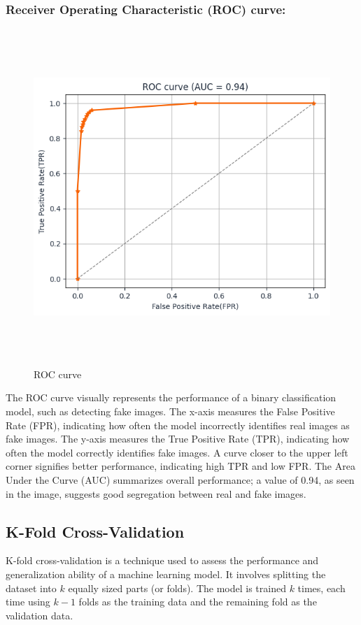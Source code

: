 \subsubsection{Receiver Operating Characteristic (ROC) curve:}
\begin{figure}[ht]
    \centering
    \includegraphics[width=5in, height =5in ]{img/ROC_AUC.png}
    \caption{{ROC curve }}
\end{figure}

\noindent The ROC curve visually represents the performance of a binary classification model, such as detecting fake images. The x-axis measures the False Positive Rate (FPR), indicating how often the model incorrectly identifies real images as fake images. The y-axis measures the True Positive Rate (TPR), indicating how often the model correctly identifies fake images. A curve closer to the upper left corner signifies better performance, indicating high TPR and low FPR. The Area Under the Curve (AUC) summarizes overall performance; a value of 0.94, as seen in the image, suggests good segregation  between real and fake images.
\newpage
\subsection{K-Fold Cross-Validation}

K-fold cross-validation is a technique used to assess the performance and generalization ability of a machine learning model. It involves splitting the dataset into \(k\) equally sized parts (or folds). The model is trained \(k\) times, each time using \(k-1\) folds as the training data and the remaining fold as the validation data.\\

